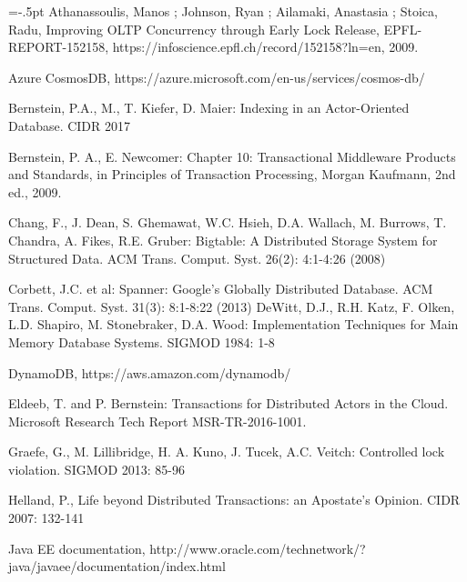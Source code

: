 \documentclass[11pt]{article}
\begin{document}
 
\vspace{-.1cm}

\begin{thebibliography}{10}
\begin{small}
\itemsep=-.5pt
Athanassoulis, Manos ; Johnson, Ryan ; Ailamaki, Anastasia ; Stoica, Radu, Improving OLTP Concurrency through Early Lock Release, EPFL-REPORT-152158, https://infoscience.epfl.ch/record/152158?ln=en, 2009. 

Azure CosmosDB, https://azure.microsoft.com/en-us/services/cosmos-db/ 

Bernstein, P.A., M., T. Kiefer, D. Maier: Indexing in an Actor-Oriented Database. CIDR 2017  

Bernstein, P. A., E. Newcomer: Chapter 10: Transactional Middleware Products and Standards, in Principles of Transaction Processing, Morgan Kaufmann, 2nd ed., 2009. 

Chang, F., J. Dean, S. Ghemawat, W.C. Hsieh, D.A. Wallach, M. Burrows, T. Chandra, A. Fikes, R.E. Gruber: Bigtable: A Distributed Storage System for Structured Data. ACM Trans. Comput. Syst. 26(2): 4:1-4:26 (2008) 


Corbett, J.C. et al: Spanner: Google's Globally Distributed Database. ACM Trans. Comput. Syst. 31(3): 8:1-8:22 (2013) 
DeWitt, D.J., R.H. Katz, F. Olken, L.D. Shapiro, M. Stonebraker, D.A. Wood: Implementation Techniques for Main Memory Database Systems. SIGMOD 1984: 1-8 

DynamoDB, https://aws.amazon.com/dynamodb/ 

Eldeeb, T. and P. Bernstein: Transactions for Distributed Actors in the Cloud. Microsoft Research Tech Report MSR-TR-2016-1001. 

Graefe, G., M. Lillibridge, H. A. Kuno, J. Tucek, A.C. Veitch: Controlled lock violation. SIGMOD 2013: 85-96 

Helland, P., Life beyond Distributed Transactions: an Apostate's Opinion. CIDR 2007: 132-141 

Java EE documentation, http://www.oracle.com/technetwork/?java/javaee/documentation/index.html  


\end{small}
\end{thebibliography}
\end{document}
